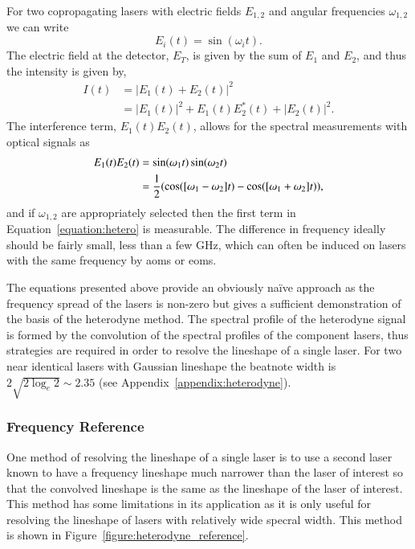 For two copropagating lasers with electric fields $E_{1, 2}$ and angular frequencies $\omega_{1, 2}$ we can write
\begin{equation}
E_{i}(t) = \sin(\omega_{i}t).
\end{equation}
The electric field at the detector, $E_T$, is given by the sum of $E_{1}$ and $E_{2}$, and thus the intensity is given by,
\begin{align}
I(t) &= |E_1(t) + E_2(t)|^2\nonumber\\
&= |E_1(t)|^2 + E_1(t)E_2^*(t) + |E_2(t)|^2.
\end{align}
The interference term, $E_1(t)E_2(t)$, allows for the spectral measurements with optical signals as
\begin{align}
E_1(t)E_2(t) &= \sin(\omega_1 t) \sin(\omega_2 t) \notag \\
&= \frac{1}{2} (\cos([\omega_1-\omega_2]t) - \cos([\omega_1+\omega_2]t)), \label{equation:hetero}
\end{align}
and if $\omega_{1,2}$ are appropriately selected then the first term in Equation~\ref{equation:hetero} is measurable.
The difference in frequency ideally should be fairly small, less than a few GHz, which can often be induced on lasers with the same frequency by \glspl{aom} or \glspl{eom}.

The equations presented above provide an obviously na\"ive approach as the frequency spread of the lasers is non-zero but gives a sufficient demonstration of the basis of the heterodyne method.
The spectral profile of the heterodyne signal is formed by the convolution of the spectral profiles of the component lasers, thus strategies are required in order to resolve the lineshape of a single laser.
For two near identical lasers with Gaussian lineshape the beatnote width is $2\sqrt{2\log_e2}\sim2.35$ (see Appendix~\ref{appendix:heterodyne}).

\subsubsection{Frequency Reference}
One method of resolving the lineshape of a single laser is to use a second laser known to have a frequency lineshape much narrower than the laser of interest so that the convolved lineshape is the same as the lineshape of the laser of interest.
This method has some limitations in its application as it is only useful for resolving the lineshape of lasers with relatively wide specral width.
This method is shown in Figure~\ref{figure:heterodyne_reference}.

